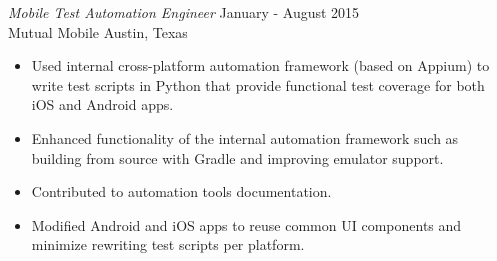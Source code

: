 \documentclass[line,margin]{res}
\begin{document}
\begin{resume}
\begin{itemize}




    \end{itemize}

    {\sl Mobile Test Automation Engineer } \hfill January - August 2015 \\
    { Mutual Mobile } \hfill Austin, Texas \\
    \begin{itemize} \itemsep -2pt
        \item \small Used internal cross-platform automation framework (based on Appium) to write test scripts in Python that provide functional test coverage for both iOS and Android apps.
        \item \small Enhanced functionality of the internal automation framework such as building from source with Gradle and improving emulator support.
        \item \small Contributed to automation tools documentation.
        \item \small Modified Android and iOS apps to reuse common UI components and minimize rewriting test scripts per platform.
    \end{itemize}


\end{resume}
\end{document}
